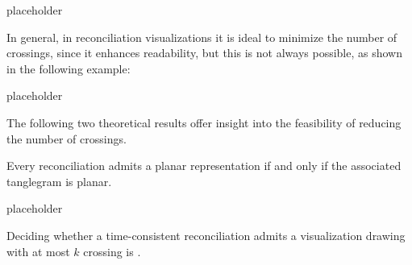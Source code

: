 \documentclass[a4paper, 12pt]{report}
\begin{document}
    placeholder 

    In general, in reconciliation visualizations it is ideal to minimize the number of crossings, since it enhances readability, but this is not always possible, as shown in the following example:

    placeholder 

    The following two theoretical results offer insight into the feasibility of reducing the number of crossings.

    \begin{framedthm}{}
        Every reconciliation admits a planar representation if and only if the associated tanglegram is planar.
    \end{framedthm}

    placeholder 

    \begin{framedthm}{}
        Deciding whether a time-consistent reconciliation admits a visualization drawing with at most $k$ crossing is \NPComplete.
    \end{framedthm}

    \printbibliography
\end{document}
